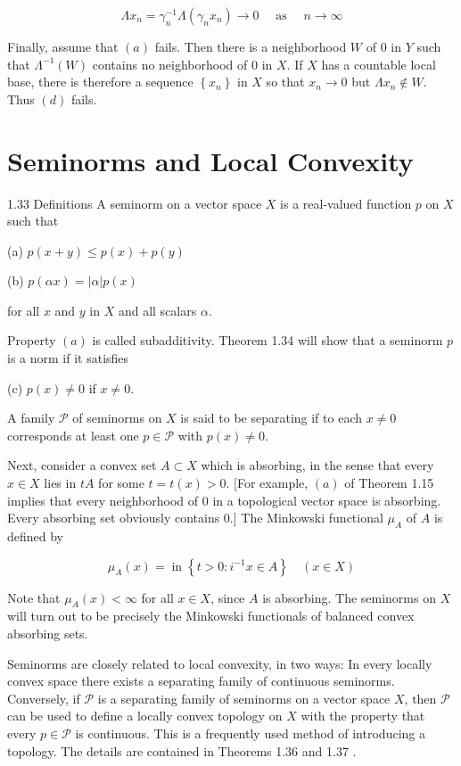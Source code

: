 \documentclass[10pt]{article}
\begin{document}
$$
\Lambda x_{n}=\gamma_{n}^{-1} \Lambda\left(\gamma_{n} x_{n}\right) \rightarrow 0 \quad \text { as } \quad n \rightarrow \infty
$$

Finally, assume that $(a)$ fails. Then there is a neighborhood $W$ of 0 in $Y$ such that $\Lambda^{-1}(W)$ contains no neighborhood of 0 in $X$. If $X$ has a countable local base, there is therefore a sequence $\left\{x_{n}\right\}$ in $X$ so that $x_{n} \rightarrow 0$ but $\Lambda x_{n} \notin W$. Thus $(d)$ fails.

\section{Seminorms and Local Convexity}
1.33 Definitions A seminorm on a vector space $X$ is a real-valued function $p$ on $X$ such that

(a) $p(x+y) \leq p(x)+p(y)$

(b) $p(\alpha x)=|\alpha| p(x)$

for all $x$ and $y$ in $X$ and all scalars $\alpha$.

Property $(a)$ is called subadditivity. Theorem 1.34 will show that a seminorm $p$ is a norm if it satisfies

(c) $p(x) \neq 0$ if $x \neq 0$.

A family $\mathscr{P}$ of seminorms on $X$ is said to be separating if to each $x \neq 0$ corresponds at least one $p \in \mathscr{P}$ with $p(x) \neq 0$.

Next, consider a convex set $A \subset X$ which is absorbing, in the sense that every $x \in X$ lies in $t A$ for some $t=t(x)>0$. [For example, $(a)$ of Theorem 1.15 implies that every neighborhood of 0 in a topological vector space is absorbing. Every absorbing set obviously contains 0.] The Minkowski functional $\mu_{A}$ of $A$ is defined by

$$
\mu_{A}(x)=\operatorname{in}\left\{t>0: i^{-1} x \in A\right\} \quad(x \in X)
$$

Note that $\mu_{A}(x)<\infty$ for all $x \in X$, since $A$ is absorbing. The seminorms on $X$ will turn out to be precisely the Minkowski functionals of balanced convex absorbing sets.

Seminorms are closely related to local convexity, in two ways: In every locally convex space there exists a separating family of continuous seminorms. Conversely, if $\mathscr{P}$ is a separating family of seminorms on a vector space $X$, then $\mathscr{P}$ can be used to define a locally convex topology on $X$ with the property that every $p \in \mathscr{P}$ is continuous. This is a frequently used method of introducing a topology. The details are contained in Theorems 1.36 and 1.37 .
\end{document}

